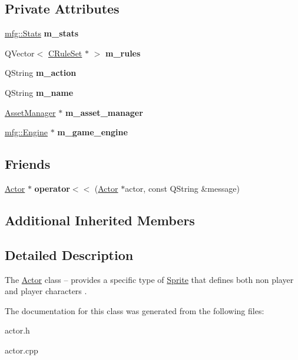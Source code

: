 \subsection*{Private Attributes}
\begin{DoxyCompactItemize}
\item 
\mbox{\label{class_actor_a6ceacbad9e2f687e035f1dbb6025b41e}} 
\hyperlink{structmfg_1_1_stats}{mfg\+::\+Stats} {\bfseries m\+\_\+stats}
\item 
\mbox{\label{class_actor_a5e7b5f03b4aef4a5164bba8df67e6043}} 
Q\+Vector$<$ \hyperlink{class_c_rule_set}{C\+Rule\+Set} $\ast$ $>$ {\bfseries m\+\_\+rules}
\item 
\mbox{\label{class_actor_ae3c7bb3e0a6548749b14b6d38b5b50ac}} 
Q\+String {\bfseries m\+\_\+action}
\item 
\mbox{\label{class_actor_a487d4e428e72810694df2bc7885f3cff}} 
Q\+String {\bfseries m\+\_\+name}
\item 
\mbox{\label{class_actor_a68280d58a3ca52e36b826dcce8d4599b}} 
\hyperlink{class_asset_manager}{Asset\+Manager} $\ast$ {\bfseries m\+\_\+asset\+\_\+manager}
\item 
\mbox{\label{class_actor_aab6640a44131bbabd6f02bc396afdbf0}} 
\hyperlink{classmfg_1_1_engine}{mfg\+::\+Engine} $\ast$ {\bfseries m\+\_\+game\+\_\+engine}
\end{DoxyCompactItemize}
\subsection*{Friends}
\begin{DoxyCompactItemize}
\item 
\mbox{\label{class_actor_af3ffe8761cd2ebd2b92033654d49a2e7}} 
\hyperlink{class_actor}{Actor} $\ast$ {\bfseries operator$<$$<$} (\hyperlink{class_actor}{Actor} $\ast$actor, const Q\+String \&message)
\end{DoxyCompactItemize}
\subsection*{Additional Inherited Members}


\subsection{Detailed Description}
The \hyperlink{class_actor}{Actor} class -- provides a specific type of \hyperlink{class_sprite}{Sprite} that defines both non player and player characters . 

The documentation for this class was generated from the following files\+:\begin{DoxyCompactItemize}
\item 
actor.\+h\item 
actor.\+cpp\end{DoxyCompactItemize}
